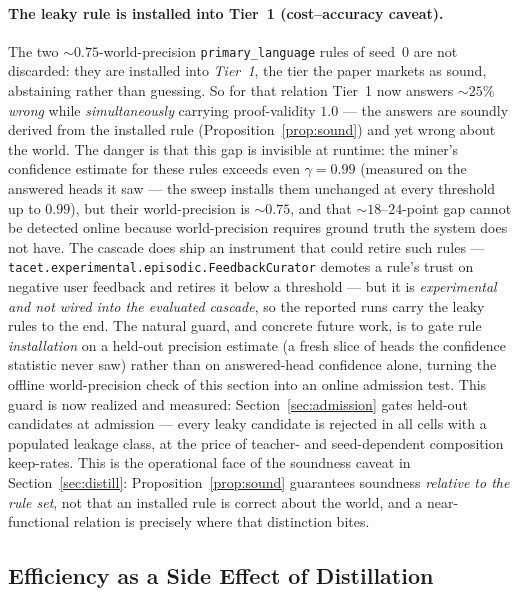 \documentclass[11pt]{article}
\theoremstyle{plain}
\begin{document}
\paragraph{The leaky rule is installed into Tier~1 (cost--accuracy caveat).}
The two $\sim\!0.75$-world-precision \texttt{primary\_language} rules of seed~$0$
are not discarded: they are installed into \emph{Tier~1}, the tier the paper
markets as sound, abstaining rather than guessing. So for that relation Tier~1
now answers ${\sim}25\%$ \emph{wrong} while \emph{simultaneously} carrying
proof-validity $1.0$ --- the answers are soundly derived from the installed rule
(Proposition~\ref{prop:sound}) and yet wrong about the world. The danger is that
this gap is invisible at runtime: the miner's confidence estimate for these rules
exceeds even $\gamma{=}0.99$ (measured on the answered heads it saw --- the
sweep installs them unchanged at every threshold up to $0.99$), but their
world-precision is ${\sim}0.75$, and that ${\sim}18$--$24$-point gap cannot be detected online because
world-precision requires ground truth the system does not have. The cascade does
ship an instrument that could retire such rules ---
\texttt{tacet.experimental.episodic.FeedbackCurator} demotes a rule's trust on
negative user feedback and retires it below a threshold --- but it is
\emph{experimental and not wired into the evaluated cascade}, so the reported runs
carry the leaky rules to the end. The natural guard, and concrete future work, is
to gate rule \emph{installation} on a held-out precision estimate (a fresh slice
of heads the confidence statistic never saw) rather than on answered-head
confidence alone, turning the offline world-precision check of this section into
an online admission test. This guard is now realized and measured:
Section~\ref{sec:admission} gates held-out candidates at admission --- every
leaky candidate is rejected in all cells with a populated leakage class, at
the price of teacher- and seed-dependent composition keep-rates. This is the operational face of the soundness caveat in
Section~\ref{sec:distill}: Proposition~\ref{prop:sound} guarantees soundness
\emph{relative to the rule set}, not that an installed rule is correct about the
world, and a near-functional relation is precisely where that distinction bites.

\subsection{Efficiency as a Side Effect of Distillation}
\label{sec:efficiency}
\end{document}
